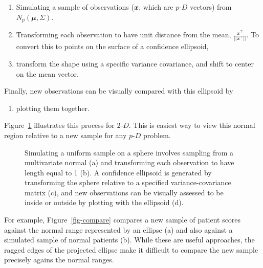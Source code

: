 \documentclass[
  12pt,
]{interact}
\providecommand{\tightlist}{%
  \setlength{\itemsep}{0pt}\setlength{\parskip}{0pt}}\usepackage{longtable,booktabs,array}
\def\tightlist{}
\newcommand\pD{$p\text{-}D$}
\newcommand\gD{$2\text{-}D$}
\begin{document}
\begin{enumerate}
\def\labelenumi{\arabic{enumi}.}
\item
  Simulating a sample of observations (\(\mathbfit{x}\), which are \pD{}
  vectors) from \(N_p(\mathbfit{\mu}, \Sigma)\).
\item
  Transforming each observation to have unit distance from the mean,
  \(\frac{\mathbfit{x}^\top}{||\mathbfit{x}^\top||}\). To convert this
  to points on the surface of a confidence ellipsoid,
\item
  transform the shape using a specific variance covariance, and shift to
  center on the mean vector.
\end{enumerate}

Finally, new observations can be visually compared with this ellipsoid
by

\begin{enumerate}
\def\labelenumi{\arabic{enumi}.}
\setcounter{enumi}{3}
\tightlist
\item
  plotting them together.
\end{enumerate}

Figure~\ref{fig-ci} illustrates this process for \gD. This is easiest
way to view this normal region relative to a new sample for any \pD{}
problem.

\begin{figure}


\caption{\label{fig-ci}Simulating a uniform sample on a sphere involves
sampling from a multivariate normal (a) and transforming each
observation to have length equal to 1 (b). A confidence ellipsoid is
generated by transforming the sphere relative to a specified
variance-covariance matrix (c), and new observations can be visually
assessed to be inside or outside by plotting with the ellipsoid (d).}

\end{figure}%

For example, Figure~\ref{fig-compare} compares a new sample of patient
scores against the normal range represented by an ellipse (a) and also
against a simulated sample of normal patients (b). While these are
useful approaches, the ragged edges of the projected ellipse make it
difficult to compare the new sample precisely agains the normal ranges.
\end{document}

